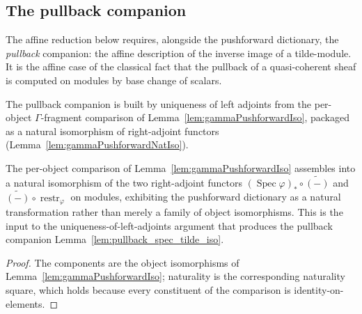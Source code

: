 \subsection{The pullback companion}

The affine reduction below requires, alongside the pushforward dictionary, the
\emph{pullback} companion: the affine description of the inverse image of a
tilde-module. It is the affine case of the classical fact that the pullback of a
quasi-coherent sheaf is computed on modules by base change of scalars.

The pullback companion is built by uniqueness of left adjoints from the
per-object \(\Gamma\)-fragment comparison of
Lemma~\ref{lem:gammaPushforwardIso}, packaged as a natural isomorphism of
right-adjoint functors (Lemma~\ref{lem:gammaPushforwardNatIso}).

\begin{lemma}


  \label{lem:gammaPushforwardNatIso}
  The per-object comparison of Lemma~\ref{lem:gammaPushforwardIso} assembles into a
  natural isomorphism of the two right-adjoint functors
  \((\operatorname{Spec}\varphi)_* \circ \widetilde{(-)}\) and
  \(\widetilde{(-)} \circ \operatorname{restr}_\varphi\) on modules, exhibiting the
  pushforward dictionary as a natural transformation rather than merely a family of
  object isomorphisms. This is the input to the uniqueness-of-left-adjoints argument
  that produces the pullback companion Lemma~\ref{lem:pullback_spec_tilde_iso}.
\end{lemma}
\begin{proof}
  The components are the object isomorphisms of Lemma~\ref{lem:gammaPushforwardIso};
  naturality is the corresponding naturality square, which holds because every
  constituent of the comparison is identity-on-elements.
\end{proof}

